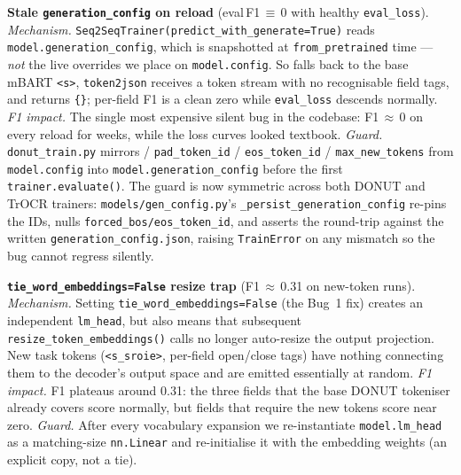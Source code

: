 \item \textbf{Stale \texttt{generation\_config} on reload}
  (eval\,F1\,$\equiv$\,0 with healthy \texttt{eval\_loss}).
  \textit{Mechanism.} \texttt{Seq2SeqTrainer}\-\texttt{(predict\_with\_generate=True)}
  reads \texttt{model.generation\_config}, which is snapshotted at
  \texttt{from\_pretrained} time --- \emph{not} the live overrides
  we place on \texttt{model.config}.  So
   falls back to the base mBART
  \texttt{<s>}, \texttt{token2json} receives a token stream with no
  recognisable field tags, and returns \texttt{\{\}}; per-field F1
  is a clean zero while \texttt{eval\_loss} descends normally.
  \textit{F1 impact.} The single most expensive silent bug in the
  codebase: F1\,$\approx$\,0 on every reload for weeks, while the
  loss curves looked textbook.  \textit{Guard.}
  \texttt{donut\_train.py} mirrors
   / \texttt{pad\_token\_id} /
  \texttt{eos\_token\_id} / \texttt{max\_new\_tokens} from
  \texttt{model.config} into \texttt{model.generation\_config}
  before the first \texttt{trainer.evaluate()}.
  The guard is now symmetric across both DONUT and TrOCR trainers:
  \texttt{models/gen\_config.py}'s \texttt{\_persist\_generation\_config}
  re-pins the IDs, nulls \texttt{forced\_bos/eos\_token\_id}, and
  asserts the round-trip against the written
  \texttt{generation\_config.json}, raising \texttt{TrainError} on
  any mismatch so the bug cannot regress silently.

\item \textbf{\texttt{tie\_word\_embeddings=False} resize trap}
  (F1\,$\approx$\,0.31 on new-token runs).
  \textit{Mechanism.} Setting \texttt{tie\_word\_embeddings=False}
  (the Bug~1 fix) creates an independent \texttt{lm\_head}, but also
  means that subsequent \texttt{resize\_token\_embeddings()} calls
  no longer auto-resize the output projection.  New task tokens
  (\texttt{<s\_sroie>}, per-field open/close tags) have nothing
  connecting them to the decoder's output space and are emitted
  essentially at random.  \textit{F1 impact.} F1 plateaus around
  0.31: the three fields that the base DONUT tokeniser already
  covers score normally, but fields that require the new tokens
  score near zero.  \textit{Guard.} After every vocabulary expansion
  we re-instantiate \texttt{model.lm\_head} as a matching-size
  \texttt{nn.Linear} and re-initialise it with the embedding weights
  (an explicit copy, not a tie).

